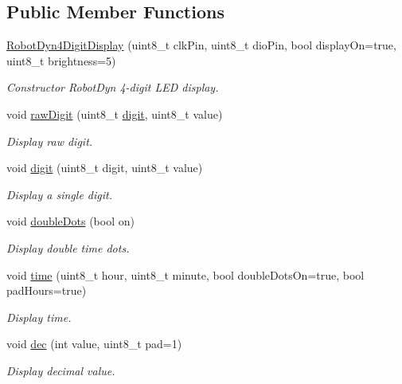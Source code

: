 \subsection*{Public Member Functions}
\begin{DoxyCompactItemize}
\item 
\hyperlink{class_robot_dyn4_digit_display_ad4240ac103a42b221593fb0110aa8032}{Robot\+Dyn4\+Digit\+Display} (uint8\+\_\+t clk\+Pin, uint8\+\_\+t dio\+Pin, bool display\+On=true, uint8\+\_\+t brightness=5)
\begin{DoxyCompactList}\small\item\em Constructor Robot\+Dyn 4-\/digit L\+ED display. \end{DoxyCompactList}\item 
void \hyperlink{class_robot_dyn4_digit_display_a7f990760be0a939de2e97c323f93e91a}{raw\+Digit} (uint8\+\_\+t \hyperlink{class_robot_dyn4_digit_display_aa0a682be1d560c1c93f547539b971806}{digit}, uint8\+\_\+t value)
\begin{DoxyCompactList}\small\item\em Display raw digit. \end{DoxyCompactList}\item 
void \hyperlink{class_robot_dyn4_digit_display_aa0a682be1d560c1c93f547539b971806}{digit} (uint8\+\_\+t digit, uint8\+\_\+t value)
\begin{DoxyCompactList}\small\item\em Display a single digit. \end{DoxyCompactList}\item 
void \hyperlink{class_robot_dyn4_digit_display_a1906505c29cfcb7baa7f4b9162301f6e}{double\+Dots} (bool on)
\begin{DoxyCompactList}\small\item\em Display double time dots. \end{DoxyCompactList}\item 
void \hyperlink{class_robot_dyn4_digit_display_aa7382284633fff676ae746f0270024bd}{time} (uint8\+\_\+t hour, uint8\+\_\+t minute, bool double\+Dots\+On=true, bool pad\+Hours=true)
\begin{DoxyCompactList}\small\item\em Display time. \end{DoxyCompactList}\item 
void \hyperlink{class_robot_dyn4_digit_display_af99a7b39a0e4dc6bfa8d1fef6a835651}{dec} (int value, uint8\+\_\+t pad=1)
\begin{DoxyCompactList}\small\item\em Display decimal value. \end{DoxyCompactList}\item 

\end{DoxyCompactItemize}
